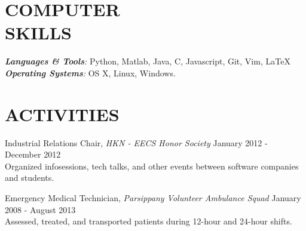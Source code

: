 \documentclass[line,margin]{res}
\begin{document}
\begin{resume}
\section{COMPUTER \\ SKILLS}
{\sl{\bf Languages \& Tools}: }Python, Matlab, Java, C, Javascript, Git,
    Vim, \LaTeX \\
{\sl{\bf Operating Systems}:} OS X, Linux, Windows.

\section{ACTIVITIES}
Industrial Relations Chair, {\it HKN - EECS Honor Society}
    \hfill {\small January 2012 - December 2012}\\
Organized infosessions, tech talks, and other events between software companies and students.

Emergency Medical Technician, {\it Parsippany Volunteer Ambulance Squad}
    \hfill {\small January 2008 - August 2013}\\
Assessed, treated, and transported patients during 12-hour and 24-hour shifts.

\end{resume}
\end{document}
